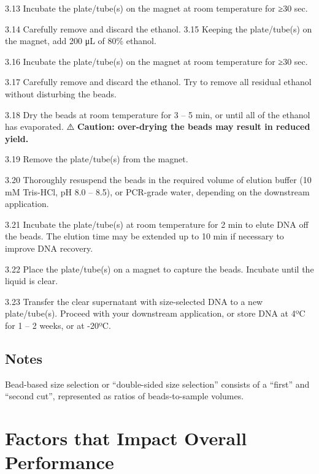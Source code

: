 \documentclass[
  letterpaper,
  DIV=11,
  numbers=noendperiod]{scrreprt}
\begin{document}
3.13 Incubate the plate/tube(s) on the magnet at room temperature for
≥30 sec.

3.14 Carefully remove and discard the ethanol. 3.15 Keeping the
plate/tube(s) on the magnet, add 200 μL of 80\% ethanol.

3.16 Incubate the plate/tube(s) on the magnet at room temperature for
≥30 sec.

3.17 Carefully remove and discard the ethanol. Try to remove all
residual ethanol without disturbing the beads.

3.18 Dry the beads at room temperature for 3 -- 5 min, or until all of
the ethanol has evaporated. ⚠️ \textbf{Caution: over-drying the beads
may result in reduced yield.}

3.19 Remove the plate/tube(s) from the magnet.

3.20 Thoroughly resuspend the beads in the required volume of elution
buffer (10 mM Tris-HCl, pH 8.0 -- 8.5), or PCR-grade water, depending on
the downstream application.

3.21 Incubate the plate/tube(s) at room temperature for 2 min to elute
DNA off the beads. The elution time may be extended up to 10 min if
necessary to improve DNA recovery.

3.22 Place the plate/tube(s) on a magnet to capture the beads. Incubate
until the liquid is clear.

3.23 Transfer the clear supernatant with size-selected DNA to a new
plate/tube(s). Proceed with your downstream application, or store DNA at
4ºC for 1 -- 2 weeks, or at -20ºC.

\hypertarget{notes-2}{%
\subsection*{\texorpdfstring{\textbf{Notes}}{Notes}}\label{notes-2}}

Bead-based size selection or ``double-sided size selection'' consists of
a ``first'' and ``second cut'', represented as ratios of beads-to-sample
volumes.

\hypertarget{factors-that-impact-overall-performance}{%
\section*{\texorpdfstring{\textbf{Factors that Impact Overall
Performance}}{Factors that Impact Overall Performance}}\label{factors-that-impact-overall-performance}}
\end{document}
